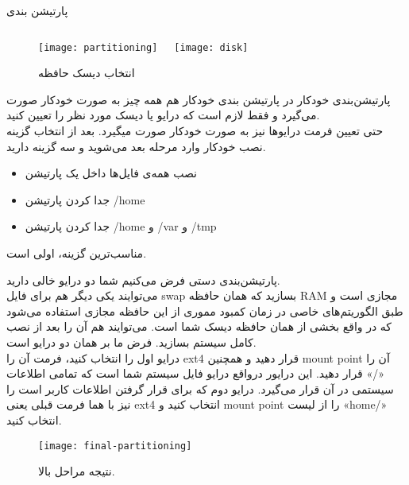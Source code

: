 \begin{frame}{پارتیشن بندی}
    \begin{figure}
      \begin{columns}
        \texttt{[image: partitioning]}
        \caption{انتخاب روش پارتیشن بندی~\cite{fig:deb_partitioning,}}
        \texttt{[image: disk]}
        \caption{انتخاب دیسک حافظه~\cite{fig:deb_disk}}
      \end{columns}
    \end{figure}
\end{frame}

\begin{frame}{پارتیشن‌بندی خودکار}
  در پارتیشن بندی خودکار هم همه چیز به صورت خودکار صورت می‌گیرد و فقط لازم است که درایو یا دیسک مورد نظر را تعیین کنید.\\
  حتی تعیین فرمت درایوها نیز به صورت خودکار صورت میگیرد.
  بعد از انتخاب گزینه نصب خودکار وارد مرحله بعد می‌شوید و سه گزینه دارید.\\
  \begin{itemize}
    \item نصب همه‌ی فایل‌ها داخل یک پارتیشن
    \item جدا کردن پارتیشن /home
    \item جدا کردن پارتیشن /home و /var و /tmp
  \end{itemize}
  مناسب‌ترین گزینه، اولی است.
\end{frame}
\begin{frame}{پارتیشن‌بندی دستی}
  فرض می‌کنیم شما دو درایو خالی دارید.\\ می‌توایند یکی دیگر هم برای فایل swap بسازید که همان حافظه RAM مجازی است و طبق الگوریتم‌های خاصی در زمان کمبود مموری از این حافظه مجازی استفاده می‌شود که در واقع بخشی از همان حافظه دیسک شما است. می‌توایند هم آن را بعد از نصب کامل سیستم بسازید.
  فرض ما بر همان دو درایو است.\\
  درایو اول را انتخاب کنید، فرمت آن را ext4 قرار دهید و همچنین mount point آن را «/» قرار دهید. این درایور درواقع درایو فایل سیستم شما است که تمامی اطلاعات سیستمی در آن قرار می‌گیرد.
  درایو دوم که برای قرار گرفتن اطلاعات کاربر است را نیز با هما فرمت قبلی یعنی ext4 انتخاب کنید و mount point را از لیست «home/» انتخاب کنید.\\
 \begin{figure}
    \texttt{[image: final-partitioning]}
    \caption{ نتیجه مراحل بالا.~\cite{fig:finish_partitioning}}
  \end{figure}
\end{frame}
